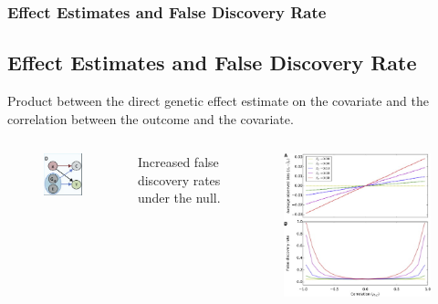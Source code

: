 \documentclass{beamer}
\begin{document}
\begin{frame}
\frametitle{Effect Estimates and False Discovery Rate}
\subsection{Effect Estimates and False Discovery Rate}
Product between the direct genetic effect estimate on the covariate and the correlation between the outcome and the covariate.
\begin{columns}[c] %

\begin{figure}
\includegraphics[width=0.5\linewidth]{fig_1_bis}
\end{figure}

\center Increased false discovery rates under the null.

\begin{figure}
\includegraphics[width=0.7\linewidth]{fig_2}
\end{figure}

\end{columns}
\end{frame}
\end{document}
